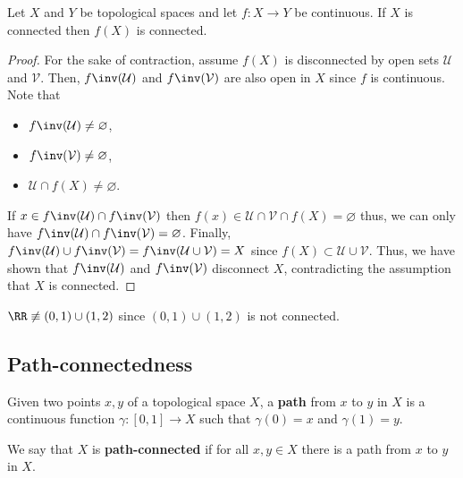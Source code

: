 \documentclass[12pt, a4paper]{article}
\begin{document}
\begin{mdthm}
    Let \(X\) and \(Y\) be topological spaces and let \(f:X \to Y\) be continuous. If \(X\) is connected then \(f(X)\) is connected.
\end{mdthm}

\begin{proof}
    For the sake of contraction, assume \(f(X)\) is disconnected by open sets \(\mathcal{U}\) and \(\mathcal{V}\). Then, \(f\inv(\mathcal{U})\) and \(f\inv(\mathcal{V})\) are also open in \(X\) since \(f\) is continuous. Note that 
    \begin{itemize}
        \item \(f\inv(\mathcal{U})\neq \varnothing\),
        \item \(f\inv(\mathcal{V}) \neq \varnothing\),
        \item \(\mathcal{U} \cap f(X)\neq\varnothing\).
    \end{itemize}
    If \(x \in f\inv(\mathcal{U}) \cap f\inv(\mathcal{V})\) then \(f(x) \in \mathcal{U} \cap \mathcal{V} \cap f(X) = \varnothing\) thus, we can only have \(f\inv(\mathcal{U}) \cap f\inv(\mathcal{V})=\varnothing\). Finally, \(f\inv(\mathcal{U}) \cup f\inv(\mathcal{V}) = f\inv(\mathcal{U} \cup \mathcal{V}) = X\) since \(f(X) \subset \mathcal{U} \cup \mathcal{V}\). Thus, we have shown that \(f\inv(\mathcal{U})\) and \(f\inv(\mathcal{V})\) disconnect \(X\), contradicting the assumption that \(X\) is connected.
\end{proof}

\begin{mdexample}
    \(\RR \not\equiv (0,1) \cup (1,2)\) since \((0,1) \cup (1,2)\) is not connected.
\end{mdexample}

\subsection{Path-connectedness}

\begin{definition}
    Given two points \(x,y\) of a topological space \(X\), a \textbf{path} from \(x\) to \(y\) in \(X\) is a continuous function \(\gamma :[0,1] \to X\) such that \(\gamma(0)=x\) and \(\gamma(1)=y\).
\end{definition}

\begin{definition}
    We say that \(X\) is \textbf{path-connected} if for all \(x,y \in X\) there is a path from \(x\) to \(y\) in \(X\).
\end{definition}
\end{document}
